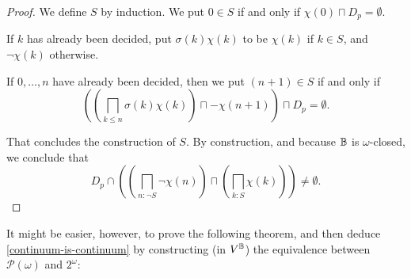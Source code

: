 \documentclass[11pt]{article}
\begin{document}
\begin{proof}
We define $S$ by induction. We put $0 \in S$ if and only if $\chi(0) \sqcap D_p = \emptyset$.

If $k$ has already been decided, put $\sigma(k) \chi(k)$ to be $\chi(k)$ if $k \in S$, and $\neg \chi(k)$ otherwise.

If $0, \dots, n$ have already been decided, then we put $(n+1) \in S$ if and only if
$$
\left(\left(\bigsqcap_{k \leq n} \sigma(k)\chi(k)\right) \sqcap - \chi(n+1)\right) \sqcap D_p = \emptyset.
$$

That concludes the construction of $S$. By construction, and because $\mathbb{B}$ is $\omega$-closed, we conclude that $$D_p \cap \left(\left(\bigsqcap_{n : \neg S} \neg \chi(n)\right) \sqcap \left(  \bigsqcap_{k : S} \chi(k) \right) \right) \neq \emptyset.$$
\end{proof}

It might be easier, however, to prove the following theorem, and then deduce \ref{continuum-is-continuum} by constructing (in $V^{\mathbb{B}}$) the equivalence between $\mathcal{P}(\omega)$ and $2^\omega$:

\end{document}
